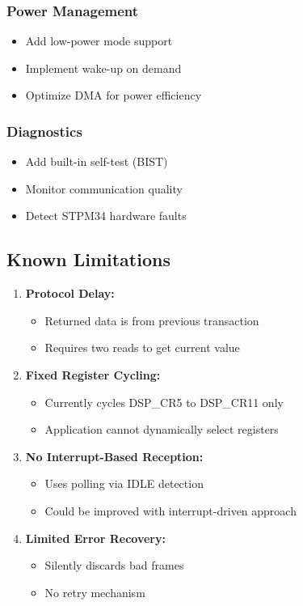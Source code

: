 \documentclass[11pt,a4paper]{article}
\begin{document}
\subsubsection{Power Management}
\begin{itemize}[noitemsep]
    \item Add low-power mode support
    \item Implement wake-up on demand
    \item Optimize DMA for power efficiency
\end{itemize}

\subsubsection{Diagnostics}
\begin{itemize}[noitemsep]
    \item Add built-in self-test (BIST)
    \item Monitor communication quality
    \item Detect STPM34 hardware faults
\end{itemize}

\subsection{Known Limitations}

\begin{enumerate}
    \item \textbf{Protocol Delay:}
    \begin{itemize}
        \item Returned data is from previous transaction
        \item Requires two reads to get current value
    \end{itemize}

    \item \textbf{Fixed Register Cycling:}
    \begin{itemize}
        \item Currently cycles DSP\_CR5 to DSP\_CR11 only
        \item Application cannot dynamically select registers
    \end{itemize}

    \item \textbf{No Interrupt-Based Reception:}
    \begin{itemize}
        \item Uses polling via IDLE detection
        \item Could be improved with interrupt-driven approach
    \end{itemize}

    \item \textbf{Limited Error Recovery:}
    \begin{itemize}
        \item Silently discards bad frames
        \item No retry mechanism
    \end{itemize}
\end{enumerate}
\end{document}
